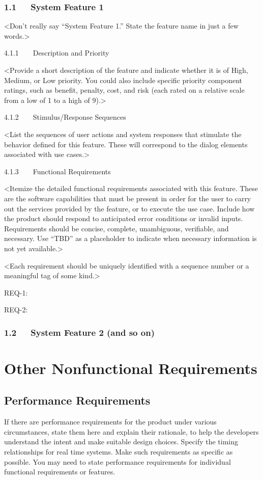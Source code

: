 \documentclass{scrreprt}
\begin{document}
\subsection*{1.1   System Feature 1}

<Don’t really say “System Feature 1.” State the feature name in just a few words.>

4.1.1    Description and Priority

<Provide a short description of the feature and indicate whether it is of High, Medium, or Low priority. You could also include specific priority component ratings, such as benefit, penalty, cost, and risk (each rated on a relative scale from a low of 1 to a high of 9).>

4.1.2    Stimulus/Response Sequences

<List the sequences of user actions and system responses that stimulate the behavior defined for this feature. These will correspond to the dialog elements associated with use cases.>

4.1.3    Functional Requirements

<Itemize the detailed functional requirements associated with this feature. These are the software capabilities that must be present in order for the user to carry out the services provided by the feature, or to execute the use case. Include how the product should respond to anticipated error conditions or invalid inputs. Requirements should be concise, complete, unambiguous, verifiable, and necessary. Use “TBD” as a placeholder to indicate when necessary information is not yet available.>

<Each requirement should be uniquely identified with a sequence number or a meaningful tag of some kind.>

REQ-1:

REQ-2:

\subsection*{1.2   System Feature 2 (and so on)}
      
    \chapter{Other Nonfunctional Requirements}
    \section{Performance Requirements} 
    If there are performance requirements for the product under various circumstances, state them here and explain their rationale, to help the developers understand the intent and make suitable design choices. Specify the timing relationships for real time systems. Make such requirements as specific as possible. You may need to state performance requirements for individual functional requirements or features. 
\end{document}
